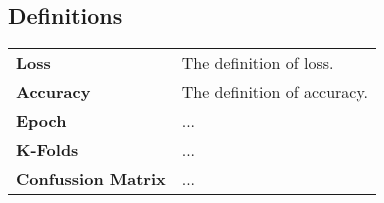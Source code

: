 \subsection{Definitions}
\label{sec:ai:define}

\begin{table}[ht]
 \begin{tabular}{ p{2cm}  p{14cm} }
 \textbf{Loss} & The definition of loss. \\ %
 \textbf{Accuracy} & The definition of accuracy. \\
 \textbf{Epoch} & ... \\
 \textbf{K-Folds} & ... \\
 \textbf{Confussion Matrix} & ... \\
\end{tabular}
\label{tab:ai_define}
\end{table}
